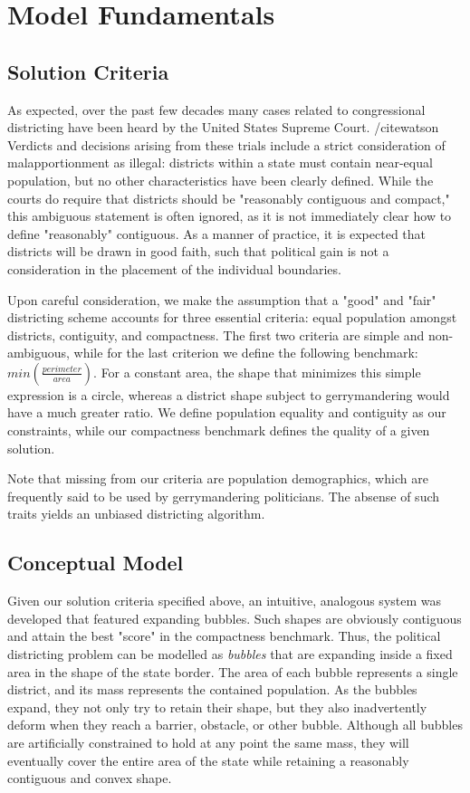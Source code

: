 \documentclass[11pt]{article}				%
\begin{document}
\section{Model Fundamentals}
\subsection{Solution Criteria}\label{sec:criteria}
As expected, over the past few decades many cases related to
congressional districting have been heard by the United States Supreme
Court. /cite{watson} Verdicts and decisions arising from these trials
include a strict consideration of malapportionment as illegal: districts
within a state must contain near-equal population, but no other
characteristics have been clearly defined. While the courts do require
that districts should be "reasonably contiguous and compact," this
ambiguous statement is often ignored, as it is not immediately clear how
to define "reasonably" contiguous. As a manner of practice, it is
expected that districts will be drawn in good faith, such that political
gain is not a consideration in the placement of the individual boundaries.

Upon careful consideration, we make the assumption that a "good" and
"fair" districting scheme accounts for three essential criteria: equal
population amongst districts, contiguity, and compactness. The first two
criteria are simple and non-ambiguous, while for the last criterion we
define the following benchmark: $min(\frac{perimeter}{area})$. For a
constant area, the shape that minimizes this simple expression is a
circle, whereas a district shape subject to gerrymandering would have a
much greater ratio. We define population equality and contiguity as our
constraints, while our compactness benchmark defines the quality of a
given solution.

Note that missing from our criteria are population demographics, which
are frequently said to be used by gerrymandering politicians. The absense 
of such traits yields an unbiased districting algorithm.

\subsection{Conceptual Model}
Given our solution criteria specified above, an intuitive, analogous
system was developed that featured expanding bubbles. Such shapes are
obviously contiguous and attain the best "score" in the compactness
benchmark. Thus, the political districting problem can be modelled as
\textit{bubbles} that are expanding inside a fixed area in the shape of
the state border. The area of each bubble represents a single district,
and its mass represents the contained population. As the bubbles expand,
they not only try to retain their shape, but they also inadvertently
deform when they reach a barrier, obstacle, or other bubble. Although all 
bubbles are artificially constrained to hold at any point the same mass,
they will eventually cover the entire area of the state while retaining a 
reasonably contiguous and convex shape.
\end{document}
